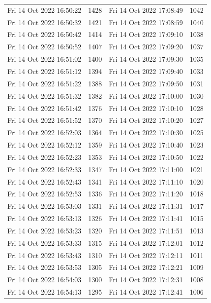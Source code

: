 \documentclass[12pt]{ctexart}
\numberwithin{equation}{section}
\begin{document}
\begin{longtable}{cc|cc}
Fri 14 Oct 2022 16:50:22 & 1428 & Fri 14 Oct 2022 17:08:49 & 1042 \\
Fri 14 Oct 2022 16:50:32 & 1421 & Fri 14 Oct 2022 17:08:59 & 1040 \\
Fri 14 Oct 2022 16:50:42 & 1414 & Fri 14 Oct 2022 17:09:10 & 1038 \\
Fri 14 Oct 2022 16:50:52 & 1407 & Fri 14 Oct 2022 17:09:20 & 1037 \\
Fri 14 Oct 2022 16:51:02 & 1400 & Fri 14 Oct 2022 17:09:30 & 1035 \\
Fri 14 Oct 2022 16:51:12 & 1394 & Fri 14 Oct 2022 17:09:40 & 1033 \\
Fri 14 Oct 2022 16:51:22 & 1388 & Fri 14 Oct 2022 17:09:50 & 1031 \\
Fri 14 Oct 2022 16:51:32 & 1382 & Fri 14 Oct 2022 17:10:00 & 1030 \\
Fri 14 Oct 2022 16:51:42 & 1376 & Fri 14 Oct 2022 17:10:10 & 1028 \\
Fri 14 Oct 2022 16:51:52 & 1370 & Fri 14 Oct 2022 17:10:20 & 1027 \\
Fri 14 Oct 2022 16:52:03 & 1364 & Fri 14 Oct 2022 17:10:30 & 1025 \\
Fri 14 Oct 2022 16:52:12 & 1359 & Fri 14 Oct 2022 17:10:40 & 1023 \\
Fri 14 Oct 2022 16:52:23 & 1353 & Fri 14 Oct 2022 17:10:50 & 1022 \\
Fri 14 Oct 2022 16:52:33 & 1347 & Fri 14 Oct 2022 17:11:00 & 1021 \\
Fri 14 Oct 2022 16:52:43 & 1341 & Fri 14 Oct 2022 17:11:10 & 1020 \\
Fri 14 Oct 2022 16:52:53 & 1336 & Fri 14 Oct 2022 17:11:20 & 1018 \\
Fri 14 Oct 2022 16:53:03 & 1331 & Fri 14 Oct 2022 17:11:31 & 1017 \\
Fri 14 Oct 2022 16:53:13 & 1326 & Fri 14 Oct 2022 17:11:41 & 1015 \\
Fri 14 Oct 2022 16:53:23 & 1320 & Fri 14 Oct 2022 17:11:51 & 1013 \\
Fri 14 Oct 2022 16:53:33 & 1315 & Fri 14 Oct 2022 17:12:01 & 1012 \\
Fri 14 Oct 2022 16:53:43 & 1310 & Fri 14 Oct 2022 17:12:11 & 1011 \\
Fri 14 Oct 2022 16:53:53 & 1305 & Fri 14 Oct 2022 17:12:21 & 1009 \\
Fri 14 Oct 2022 16:54:03 & 1300 & Fri 14 Oct 2022 17:12:31 & 1008 \\
Fri 14 Oct 2022 16:54:13 & 1295 & Fri 14 Oct 2022 17:12:41 & 1006 \\

\end{longtable}
\end{document}
